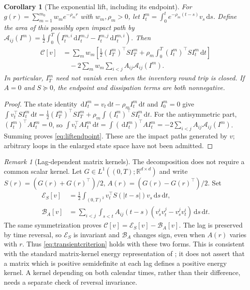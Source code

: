 \documentclass[11pt]{article}
\numberwithin{equation}{section}
\newtheorem{corollary}[theorem]{Corollary}
\theoremstyle{definition}
\theoremstyle{remark}
\newtheorem{remark}[theorem]{Remark}
\newcommand{\R}{\mathbb{R}}
\theoremstyle{definition}
\newcommand{\dd}{\,\mathrm d}
\begin{document}
\begin{corollary}[The exponential lift, including its endpoint]\label{cor:liftendpoint}
For $g(r)=\sum_{m=1}^{m_0}w_me^{-\rho_m r}$ with $w_m,\rho_m>0$, let
$I_t^m=\int_0^te^{-\rho_m(t-s)}v_s\dd s$. Define the area of this
possibly open impact path by
$\mathcal A_{ij}(I^m)=\tfrac12\int_0^T(I_t^{m,i}\dd I_t^{m,j}
-I_t^{m,j}\dd I_t^{m,i})$. Then
\begin{equation}\label{eq:liftendpoint}
 \begin{aligned}
 \mathcal C[v]&=\sum_mw_m\left[
 \frac12(I_T^m)^\top S I_T^m
 +\rho_m\int_0^T(I_t^m)^\top S I_t^m\dd t\right]\\
 &\quad-2\sum_mw_m\sum_{i<j}A_{ij}\mathcal A_{ij}(I^m).
 \end{aligned}
\end{equation}
In particular, $I_T^m$ need not vanish even when the inventory round trip
is closed. If $A=0$ and $S\succeq0$, the endpoint and dissipation terms
are both nonnegative.
\end{corollary}
\begin{proof}
The state identity $\dd I_t^m=v_t\dd t-\rho_mI_t^m\dd t$ and $I_0^m=0$
give
$\int v_t^\top S I_t^m\dd t
=\tfrac12(I_T^m)^\top S I_T^m
+\rho_m\int(I_t^m)^\top S I_t^m\dd t$.
For the antisymmetric part, $(I_t^m)^\top A I_t^m=0$, so
$\int v_t^\top A I_t^m\dd t
=\int(\dd I_t^m)^\top A I_t^m
=-2\sum_{i<j}A_{ij}\mathcal A_{ij}(I^m)$.
Summing proves \eqref{eq:liftendpoint}. These are the impact paths
generated by $v$; arbitrary loops in the enlarged state space have not
been admitted.
\end{proof}

\begin{remark}[Lag-dependent matrix kernels]\label{rem:lifted}
The decomposition does not require a common scalar kernel. Let
$G\in L^1((0,T);\R^{d\times d})$ and write
$S(r)=(G(r)+G(r)^\top)/2$, $A(r)=(G(r)-G(r)^\top)/2$. Set
\begin{align*}
 \mathcal E_S[v]&=\frac12\int_{(0,T)^2}
               v_t^\top S(|t-s|)v_s\dd s\dd t,\\
 \mathcal B_A[v]&=\sum_{i<j}\int_{s<t}A_{ij}(t-s)
                (v_s^iv_t^j-v_s^jv_t^i)\dd s\dd t .
\end{align*}
The same symmetrization proves $\mathcal C[v]=\mathcal E_S[v]-\mathcal B_A[v]$.
The lag is preserved by time reversal, so $\mathcal E_S$ is invariant
and $\mathcal B_A$ changes sign, even when $A(r)$ varies with $r$.
Thus \eqref{eq:transientcriterion} holds with these two forms.
This is consistent with the standard matrix-kernel energy representation
of \citet{alfonsiklockschied2016}; it does not assert that a matrix
which is positive semidefinite at each lag defines a positive energy kernel.
A kernel depending on both calendar times, rather than their difference,
needs a separate check of reversal invariance.
\end{remark}
\end{document}
